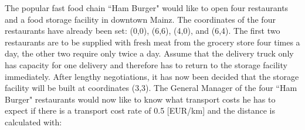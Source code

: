
The popular fast food chain ``Ham Burger" would like to open four restaurants and a food storage facility in downtown Mainz. The coordinates of the four restaurants have already been set: (0,0), (6,6), (4,0), and (6,4). The first two restaurants are to be supplied with fresh meat from the grocery store four times a day, the other two require only twice a day. Assume that the delivery truck only has capacity for one delivery and therefore has to return to the storage facility immediately. After lengthy negotiations, it has now been decided that the storage facility will be built at coordinates (3,3). The General Manager of the four ``Ham Burger" restaurants would now like to know what transport costs he has to expect if there is a transport cost rate of 0.5 [EUR/km] and the distance is calculated with:
